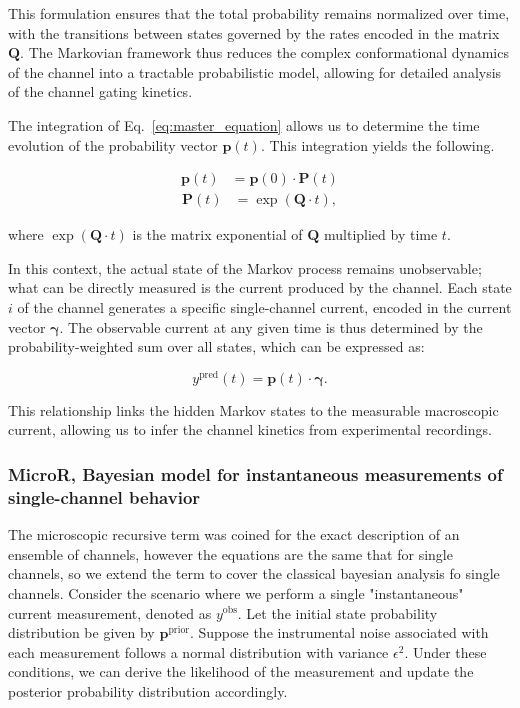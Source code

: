 \documentclass[pdflatex,sn-mathphys-num]{sn-jnl}%
\theoremstyle{thmstyleone}%
\theoremstyle{thmstyletwo}%
\theoremstyle{thmstylethree}%
\begin{document}
This formulation ensures that the total probability remains normalized over time, with the transitions between states governed by the rates encoded in the matrix \( \boldsymbol{Q} \). The Markovian framework thus reduces the complex conformational dynamics of the channel into a tractable probabilistic model, allowing for detailed analysis of the channel gating kinetics.


The integration of Eq.~\ref{eq:master_equation} allows us to determine the time evolution of the probability vector \( \boldsymbol{p}(t) \). This integration yields the following.


\begin{align}
	\boldsymbol{p}(t) &= \boldsymbol{p}(0) \cdot \boldsymbol{P}(t)
	\label{eq:master_equation_solution}
\end{align}
\begin{align}
	\boldsymbol{P} (t) &= \exp(\boldsymbol{Q} \cdot t),
	\label{eq:Transition_Matrix_definition}
\end{align}


where \( \exp(\boldsymbol{Q} \cdot t) \) is the matrix exponential of \( \boldsymbol{Q} \) multiplied by time \( t \). 

In this context, the actual state of the Markov process remains unobservable; what can be directly measured is the current produced by the channel. Each state \( i \) of the channel generates a specific single-channel current, encoded in the current vector \( \boldsymbol{\gamma} \). The observable current at any given time is thus determined by the probability-weighted sum over all states, which can be expressed as:

\begin{equation}
	y^{\text{pred}}(t) = \boldsymbol{p}(t) \cdot \boldsymbol{\gamma}.
	\label{eq:single_channel_prediction}
\end{equation}

This relationship links the hidden Markov states to the measurable macroscopic current, allowing us to infer the channel kinetics from experimental recordings.



\subsubsection{MicroR, Bayesian model for instantaneous measurements of single-channel behavior}

The microscopic recursive term was coined for the exact description of an ensemble of channels, however the equations are the same that for single channels, so we extend the term to cover the classical bayesian analysis fo single channels. 
Consider the scenario where we perform a single "instantaneous" current measurement, denoted as \( y^{\text{obs}} \). Let the initial state probability distribution be given by \( \boldsymbol{p}^{\text{prior}} \). Suppose the instrumental noise associated with each measurement follows a normal distribution with variance \( \epsilon^2 \). Under these conditions, we can derive the likelihood of the measurement and update the posterior probability distribution accordingly.
\end{document}
